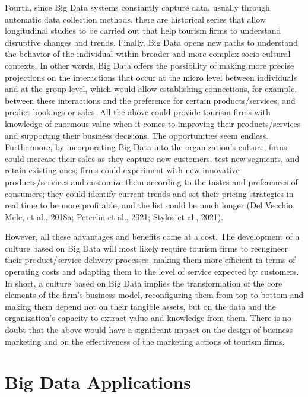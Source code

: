 \documentclass[
  letterpaper,
  DIV=11,
  numbers=noendperiod]{scrreprt}
\begin{document}
Fourth, since Big Data systems constantly capture data, usually through
automatic data collection methods, there are historical series that
allow longitudinal studies to be carried out that help tourism firms to
understand disruptive changes and trends. Finally, Big Data opens new
paths to understand the behavior of the individual within broader and
more complex socio-cultural contexts. In other words, Big Data offers
the possibility of making more precise projections on the interactions
that occur at the micro level between individuals and at the group
level, which would allow establishing connections, for example, between
these interactions and the preference for certain products/services, and
predict bookings or sales. All the above could provide tourism firms
with knowledge of enormous value when it comes to improving their
products/services and supporting their business decisions. The
opportunities seem endless. Furthermore, by incorporating Big Data into
the organization's culture, firms could increase their sales as they
capture new customers, test new segments, and retain existing ones;
firms could experiment with new innovative products/services and
customize them according to the tastes and preferences of consumers;
they could identify current trends and set their pricing strategies in
real time to be more profitable; and the list could be much longer (Del
Vecchio, Mele, et al., 2018a; Peterlin et al., 2021; Stylos et al.,
2021).

However, all these advantages and benefits come at a cost. The
development of a culture based on Big Data will most likely require
tourism firms to reengineer their product/service delivery processes,
making them more efficient in terms of operating costs and adapting them
to the level of service expected by customers. In short, a culture based
on Big Data implies the transformation of the core elements of the
firm's business model, reconfiguring them from top to bottom and making
them depend not on their tangible assets, but on the data and the
organization's capacity to extract value and knowledge from them. There
is no doubt that the above would have a significant impact on the design
of business marketing and on the effectiveness of the marketing actions
of tourism firms.

\hypertarget{big-data-applications}{%
\section{Big Data Applications}\label{big-data-applications}}
\end{document}
